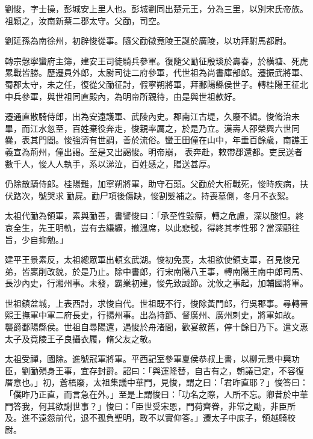 \begin{pinyinscope}
 劉悛，字士操，彭城安上里人也。彭城劉同出楚元王，分為三里，以別宋氏帝族。祖穎之，汝南新蔡二郡太守。父勔，司空。



 劉延孫為南徐州，初辟悛從事。隨父勔徵竟陵王誕於廣陵，以功拜駙馬都尉。



 轉宗愨寧蠻府主簿，建安王司徒騎兵參軍。復隨父勔征殷琰於壽春，於橫塘、死虎累戰皆勝。歷遷員外郎，太尉司徒二府參軍，代世祖為尚書庫部郎。遷振武將軍、蜀郡太守，未之任，復從父勔征討，假寧朔將軍，拜鄱陽縣侯世子。轉桂陽王征北中兵參軍，與世祖同直殿內，為明帝所親待，由是與世祖款好。



 遷通直散騎侍郎，出為安遠護軍、武陵內史。郡南江古堤，久廢不緝。悛脩治未畢，而江水忽至，百姓棄役奔走，悛親率厲之，於是乃立。漢壽人邵榮興六世同爨，表其門閭。悛強濟有世調，善於流俗。蠻王田僮在山中，年垂百餘歲，南譙王義宣為荊州，僮出謁。至是又出謁悛。明帝崩，
 表奔赴，敕帶郡還都。吏民送者數千人，悛人人執手，系以涕泣，百姓感之，贈送甚厚。



 仍除散騎侍郎。桂陽難，加寧朔將軍，助守石頭。父勔於大桁戰死，悛時疾病，扶伏路次，號哭求勔屍。勔尸項後傷缺，悛割髮補之。持喪墓側，冬月不衣絮。



 太祖代勔為領軍，素與勔善，書譬悛曰：「承至性毀瘵，轉之危慮，深以酸怛。終哀全生，先王明軌，豈有去縑纊，撤溫席，以此悲號，得終其孝性邪？當深顧往旨，少自抑勉。」



 建平王景素反，太祖總眾軍出頓玄武湖。悛初免喪，太祖欲使領支軍，召見悛兄弟，皆羸削改貌，於是乃止。除中書郎，行宋南陽八王事，轉南陽王南中郎司馬、長沙內史，行湘州事。未發，霸業初建，悛先致誠節。沈攸之事起，加輔國將軍。



 世祖鎮盆城，上表西討，求悛自代。世祖既不行，悛除黃門郎，行吳郡事。尋轉晉熙王撫軍中軍二府長史，行揚州事。出為持節、督廣州、廣州刺史，將軍如故。
 襲爵鄱陽縣侯。世祖自尋陽還，遇悛於舟渚間，歡宴敘舊，停十餘日乃下。遣文惠太子及竟陵王子良攝衣履，脩父友之敬。



 太祖受禪，國除。進號冠軍將軍。平西記室參軍夏侯恭叔上書，以柳元景中興功臣，劉勔殞身王事，宜存封爵。詔曰：「與運隆替，自古有之，朝議已定，不容復厝意也。」初，蒼梧廢，太祖集議中華門，見悛，謂之曰：「君昨直耶？」悛答曰：「僕昨乃正直，而言急在外。」至是上謂悛曰：「功名之際，人所不忘。卿昔於中華門答我，何其欲謝世事？」悛曰：「臣世受宋恩，門荷齊眷，非常之勛，非臣所及。進不遠怨前代，退不孤負聖明，敢不以實仰答。」遷太子中庶子，領越騎校尉。




\end{pinyinscope}
